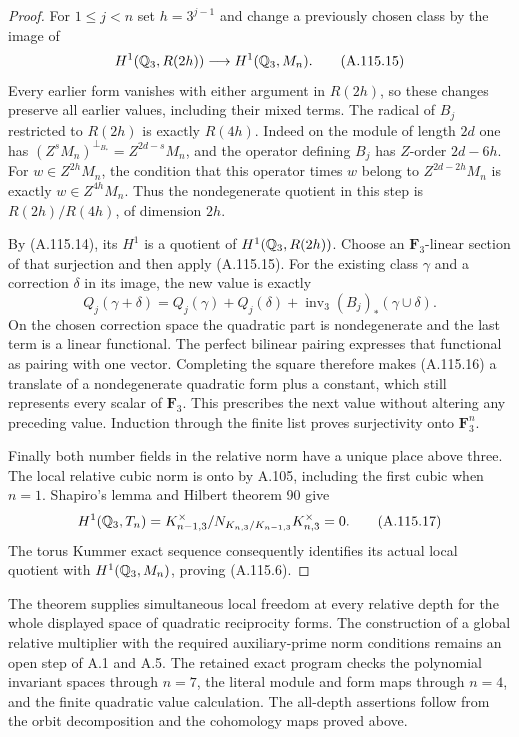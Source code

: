 \begin{proof}
For $1\leq j<n$ set $h=3^{j-1}$ and change
a previously chosen class by the image of
\[
 H^1(\mathbb Q_3,R(2h))\longrightarrow H^1(\mathbb Q_3,M_n).
\tag{A.115.15}
\]
Every earlier form vanishes with either
argument in $R(2h)$, so these changes
preserve all earlier values, including
their mixed terms.
The radical of $B_j$ restricted to $R(2h)$
is exactly $R(4h)$.
Indeed on the module of length $2d$ one has
$(Z^sM_n)^{\perp_{B_*}}=Z^{2d-s}M_n$,
and the operator defining $B_j$ has
$Z$-order $2d-6h$.
For $w\in Z^{2h}M_n$, the condition that
this operator times $w$ belong to
$Z^{2d-2h}M_n$ is exactly
$w\in Z^{4h}M_n$.
Thus the nondegenerate quotient in this
step is $R(2h)/R(4h)$, of dimension $2h$.

By (A.115.14), its $H^1$ is a quotient of
$H^1(\mathbb Q_3,R(2h))$.
Choose an $\mathbf F_3$-linear section of
that surjection and then apply (A.115.15).
For the existing class $\gamma$ and a
correction $\delta$ in its image, the
new value is exactly
\[
 Q_j(\gamma+\delta)=Q_j(\gamma)+Q_j(\delta)
       +\operatorname{inv}_3(B_j)_*(\gamma\cup\delta).
\tag{A.115.16}
\]
On the chosen correction space the
quadratic part is nondegenerate and
the last term is a linear functional.
The perfect bilinear pairing expresses
that functional as pairing with one
vector.  Completing the square therefore
makes (A.115.16) a translate of a
nondegenerate quadratic form plus a
constant, which still represents every
scalar of $\mathbf F_3$.
This prescribes the next value without
altering any preceding value.
Induction through the finite list proves
surjectivity onto $\mathbf F_3^n$.

Finally both number fields in the
relative norm have a unique place
above three.  The local relative
cubic norm is onto by A.105, including
the first cubic when $n=1$.
Shapiro's lemma and Hilbert theorem 90
give
\[
 H^1(\mathbb Q_3,T_n)=
   K_{n-1,3}^{\times}/N_{K_{n,3}/K_{n-1,3}}
                         K_{n,3}^{\times}=0.
\tag{A.115.17}
\]
The torus Kummer exact sequence consequently
identifies its actual local quotient with
$H^1(\mathbb Q_3,M_n)$, proving (A.115.6).
\end{proof}

The theorem supplies simultaneous local freedom at
every relative depth for the whole displayed space
of quadratic reciprocity forms.  The construction
of a global relative multiplier with the required
auxiliary-prime norm conditions remains an open
step of A.1 and A.5.
The retained exact program
checks the polynomial invariant spaces through
$n=7$, the literal module and form maps through
$n=4$, and the finite quadratic value calculation.
The all-depth assertions follow from the orbit
decomposition and the cohomology maps proved above.

